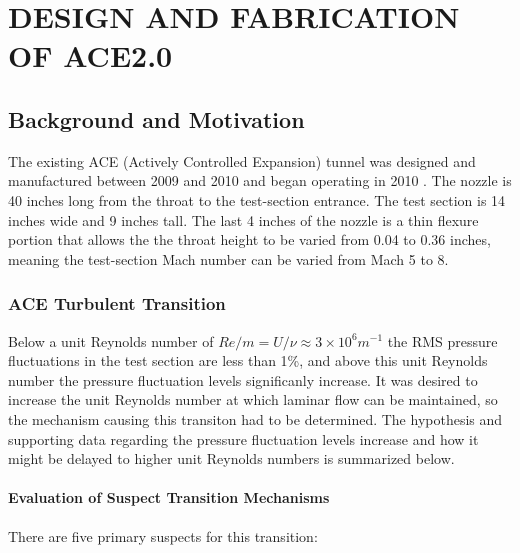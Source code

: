 %
%  
%



\chapter{DESIGN AND FABRICATION OF ACE2.0}

\section{Background and Motivation}

The existing ACE (Actively Controlled Expansion) tunnel was designed and manufactured between 2009 and 2010 and began operating in 2010 \cite{ace09,ace10-calibrate,tichenor-dis}. The nozzle is 40 inches long from the throat to the test-section entrance. The test section is 14 inches wide and 9 inches tall. The last 4 inches of the nozzle is a thin flexure portion that allows the the throat height to be varied from 0.04 to 0.36 inches, meaning the test-section Mach number can be varied from Mach 5 to 8.

\subsection{ACE Turbulent Transition}

Below a unit Reynolds number of $Re/m = U/\nu \approx 3 \times 10^6 m^{-1}$ the RMS pressure fluctuations in the test section are less than 1\%, and above this unit Reynolds number the pressure fluctuation levels significanly increase. It was desired to increase the unit Reynolds number at which laminar flow can be maintained, so the mechanism causing this transiton had to be determined. The hypothesis and supporting data regarding the pressure fluctuation levels increase and how it might be delayed to higher unit Reynolds numbers is summarized below.

\subsubsection{Evaluation of Suspect Transition Mechanisms}

There are five primary suspects for this transition:


